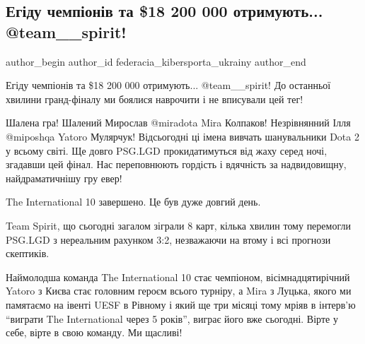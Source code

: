  
 
 
 
 
 
\subsection{Егіду чемпіонів та \$18 200 000 отримують... @team\_\_spirit!}
\label{sec:17_10_2021.fb.federacia_kibersporta_ukrainy.1.team_spirit}
 
\ifcmt
 author_begin
   author_id federacia_kibersporta_ukrainy
 author_end
\fi

Егіду чемпіонів та \$18 200 000 отримують... @team\_\_spirit! До останньої хвилини
гранд-фіналу ми боялися наврочити і не вписували цей тег!

Шалена гра! Шалений Мирослав @miradota Mira Колпаков! Незрівнянний Ілля
@miposhqa Yatoro Мулярчук! Відсьогодні ці імена вивчать шанувальники Dota 2 у
всьому світі. Ще довго PSG.LGD прокидатимуться від жаху серед ночі, згадавши
цей фінал. Нас переповнюють гордість і вдячність за надвидовищну,
найдраматичнішу гру евер!

The International 10 завершено. Це був дуже довгий день.

Team Spirit, що сьогодні загалом зіграли 8 карт, кілька хвилин тому перемогли
PSG.LGD з нереальним рахунком 3:2, незважаючи на втому і всі прогнози
скептиків. 

Наймолодша команда The International 10 стає чемпіоном, вісімнадцятирічний
Yatoro з Києва стає головним героєм всього турніру, а Mira з Луцька, якого ми
памятаємо на івенті UESF в Рівному і який ще три місяці тому мріяв в інтерв'ю
“виграти The International через 5 років”, виграє його вже сьогодні. Вірте у
себе, вірте в свою команду. Ми щасливі!

